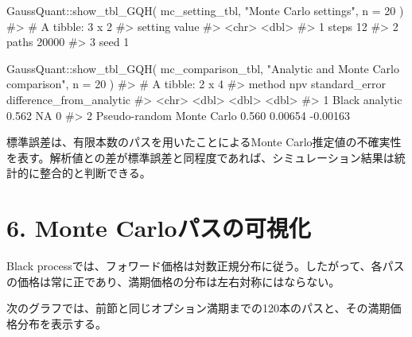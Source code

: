 \documentclass[
  letterpaper,
  DIV=11,
  numbers=noendperiod]{scrreprt}
\newenvironment{Shaded}{\begin{snugshade}}{\end{snugshade}}
\newcommand{\AttributeTok}[1]{\textcolor[rgb]{0.40,0.45,0.13}{#1}}
\newcommand{\CommentTok}[1]{\textcolor[rgb]{0.37,0.37,0.37}{#1}}
\newcommand{\DecValTok}[1]{\textcolor[rgb]{0.68,0.00,0.00}{#1}}
\newcommand{\FunctionTok}[1]{\textcolor[rgb]{0.28,0.35,0.67}{#1}}
\newcommand{\NormalTok}[1]{\textcolor[rgb]{0.00,0.23,0.31}{#1}}
\newcommand{\SpecialCharTok}[1]{\textcolor[rgb]{0.37,0.37,0.37}{#1}}
\newcommand{\StringTok}[1]{\textcolor[rgb]{0.13,0.47,0.30}{#1}}
\begin{document}
\begin{Shaded}
\begin{Highlighting}[]
\NormalTok{GaussQuant}\SpecialCharTok{::}\FunctionTok{show\_tbl\_GQH}\NormalTok{(}
\NormalTok{  mc\_setting\_tbl,}
  \StringTok{"Monte Carlo settings"}\NormalTok{,}
  \AttributeTok{n =} \DecValTok{20}
\NormalTok{)}
\CommentTok{\#\textgreater{} \# A tibble: 3 x 2}
\CommentTok{\#\textgreater{}   setting value}
\CommentTok{\#\textgreater{}   \textless{}chr\textgreater{}   \textless{}dbl\textgreater{}}
\CommentTok{\#\textgreater{} 1 steps      12}
\CommentTok{\#\textgreater{} 2 paths   20000}
\CommentTok{\#\textgreater{} 3 seed        1}

\NormalTok{GaussQuant}\SpecialCharTok{::}\FunctionTok{show\_tbl\_GQH}\NormalTok{(}
\NormalTok{  mc\_comparison\_tbl,}
  \StringTok{"Analytic and Monte Carlo comparison"}\NormalTok{,}
  \AttributeTok{n =} \DecValTok{20}
\NormalTok{)}
\CommentTok{\#\textgreater{} \# A tibble: 2 x 4}
\CommentTok{\#\textgreater{}   method                      npv standard\_error difference\_from\_analytic}
\CommentTok{\#\textgreater{}   \textless{}chr\textgreater{}                     \textless{}dbl\textgreater{}          \textless{}dbl\textgreater{}                    \textless{}dbl\textgreater{}}
\CommentTok{\#\textgreater{} 1 Black analytic            0.562       NA                        0      }
\CommentTok{\#\textgreater{} 2 Pseudo{-}random Monte Carlo 0.560        0.00654                 {-}0.00163}
\end{Highlighting}
\end{Shaded}

標準誤差は、有限本数のパスを用いたことによるMonte
Carlo推定値の不確実性を表す。解析値との差が標準誤差と同程度であれば、シミュレーション結果は統計的に整合的と判断できる。

\section{6. Monte
Carloパスの可視化}\label{monte-carloux30d1ux30b9ux306eux53efux8996ux5316}

Black
processでは、フォワード価格は対数正規分布に従う。したがって、各パスの価格は常に正であり、満期価格の分布は左右対称にはならない。

次のグラフでは、前節と同じオプション満期までの120本のパスと、その満期価格分布を表示する。
\end{document}
